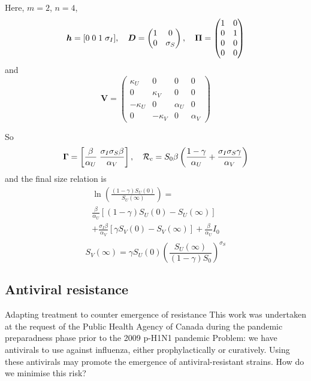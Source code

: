 \documentclass[aspectratio=169]{beamer}\usepackage[]{graphicx}\usepackage[]{xcolor}
\begin{document}
\begin{frame}
Here, $m=2$, $n=4$,
\[
\bm{h} = [0\;0\;1\;\sigma_I],\quad
\bm{D}=\begin{pmatrix}
1 & 0 \\ 0 & \sigma_S
\end{pmatrix},\quad
\bm{\Pi}=
\begin{pmatrix}
1 & 0 \\ 0 & 1 \\ 0 & 0 \\ 0 & 0
\end{pmatrix}
\]
and
\[
\mathbf{V}=
\begin{pmatrix}
\kappa_U & 0 & 0 & 0 \\
0 & \kappa_V & 0 & 0 \\
-\kappa_U & 0 & \alpha_U & 0 \\
0 & -\kappa_V & 0 & \alpha_V
\end{pmatrix}
\]
\end{frame}

\begin{frame}
So
\[
\bm{\Gamma}=\left[
\frac{\beta}{\alpha_U}\; \frac{\sigma_I\sigma_S\beta}{\alpha_V}
\right],
\quad
\mathcal{R}_c = S_0\beta\left(
\frac{1-\gamma}{\alpha_U}+\frac{\sigma_I\sigma_S\gamma}{\alpha_V}
\right)
\]
and the final size relation is
\begin{multline*}
\ln\left(
\frac{(1-\gamma)S_U(0)}{S_U(\infty)}
\right)
= \\ 
\frac{\beta}{\alpha_U}[(1-\gamma)S_U(0)-S_U(\infty)] \\
+\frac{\sigma_I\beta}{\alpha_V}[\gamma S_V(0)-S_V(\infty)]+\frac{\beta}{\alpha_U}I_0 \\
\end{multline*}
\[
S_V(\infty) = \gamma S_U(0)\left(
\frac{S_U(\infty)}{(1-\gamma)S_0}
\right)^{\sigma_S}
\]
\end{frame}

\subsection{Antiviral resistance}

\nocite{ArinoBowmanMoghadas2009}

\begin{frame}{Adapting treatment to counter emergence of resistance}
This work was undertaken at the request of the Public Health Agency of Canada during the pandemic preparadness phase prior to the 2009 p-H1N1 pandemic
\vfill
Problem: we have antivirals to use against influenza, either prophylactically or curatively. Using these antivirals may promote the emergence of antiviral-resistant strains. How do we minimise this risk?
\end{frame}
\end{document}
